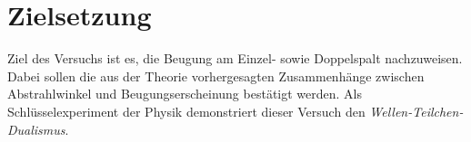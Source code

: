 \section{Zielsetzung}
\label{sec:Zielsetzung}

Ziel des Versuchs ist es, die Beugung am Einzel- sowie Doppelspalt nachzuweisen.
Dabei sollen die aus der Theorie vorhergesagten Zusammenhänge zwischen Abstrahlwinkel und Beugungserscheinung bestätigt werden.
Als Schlüsselexperiment der Physik demonstriert dieser Versuch den \textit{Wellen-Teilchen-Dualismus}.
